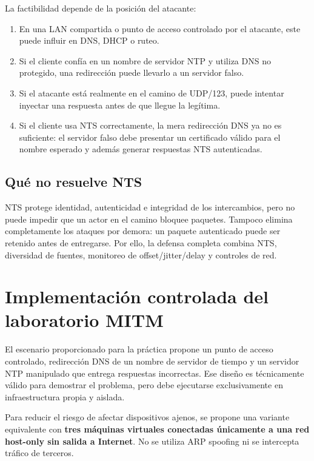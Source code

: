 \documentclass[11pt,a4paper]{article}
\newcommand{\nts}{\textsc{NTS}}
\begin{document}
La factibilidad depende de la posición del atacante:

\begin{enumerate}
    \item En una LAN compartida o punto de acceso controlado por el atacante, este puede influir en DNS, DHCP o ruteo.
    \item Si el cliente confía en un nombre de servidor NTP y utiliza DNS no protegido, una redirección puede llevarlo a un servidor falso.
    \item Si el atacante está realmente en el camino de UDP/123, puede intentar inyectar una respuesta antes de que llegue la legítima.
    \item Si el cliente usa \nts{} correctamente, la mera redirección DNS ya no es suficiente: el servidor falso debe presentar un certificado válido para el nombre esperado y además generar respuestas NTS autenticadas.
\end{enumerate}

\subsection{Qué no resuelve NTS}

NTS protege identidad, autenticidad e integridad de los intercambios, pero no puede impedir que un actor en el camino bloquee paquetes. Tampoco elimina completamente los ataques por demora: un paquete autenticado puede ser retenido antes de entregarse. Por ello, la defensa completa combina NTS, diversidad de fuentes, monitoreo de offset/jitter/delay y controles de red.

\section{Implementación controlada del laboratorio MITM}

El escenario proporcionado para la práctica propone un punto de acceso controlado, redirección DNS de un nombre de servidor de tiempo y un servidor NTP manipulado que entrega respuestas incorrectas. Ese diseño es técnicamente válido para demostrar el problema, pero debe ejecutarse exclusivamente en infraestructura propia y aislada.

Para reducir el riesgo de afectar dispositivos ajenos, se propone una variante equivalente con \textbf{tres máquinas virtuales conectadas únicamente a una red host-only sin salida a Internet}. No se utiliza ARP spoofing ni se intercepta tráfico de terceros.
\end{document}
